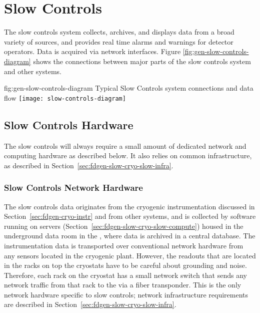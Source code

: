 \section{Slow Controls}
\label{sec:fdgen-slow-cryo-ctrl}


The slow controls system collects, archives, and displays data from
a broad variety of sources, and provides real time alarms and
warnings for detector operators. Data is acquired via network
interfaces.  Figure \ref{fig:gen-slow-controls-diagram} shows the
connections between major parts of the slow controls system and other
systems.  %

\begin{dunefigure}{fig:gen-slow-controls-diagram}
{Typical Slow Controls system connections and data flow}
\texttt{[image: slow-controls-diagram]}
\end{dunefigure}





\subsection{Slow Controls Hardware}
\label{sec:fdgen-slow-cryo-hdwr}

The slow controls will always require a small amount of dedicated network and
computing hardware as described below.  It also relies on common
infrastructure, as described in
Section~\ref{sec:fdgen-slow-cryo-slow-infra}.

\subsubsection{Slow Controls Network Hardware}
\label{sec:fdgen-slow-cryo-slow-network}
The slow controls data originates from the cryogenic instrumentation discussed in
Section~\ref{sec:fdgen-cryo-instr} and from other systems,
and is collected by software running on servers
(Section~\ref{sec:fdgen-slow-cryo-slow-compute})
housed in the underground data room in the ,
where data is archived in a central  database.
The instrumentation data is transported over
conventional network hardware from any sensors located in the cryogenic
plant.  However, the readouts that are located in the racks on top the
cryostats have to be careful about grounding and noise.  Therefore, each
rack on the cryostat has a small network switch that sends
any network traffic from that rack to the  via a fiber transponder.
This is the only network hardware specific to slow controls;
network infrastructure requirements are described in
Section~\ref{sec:fdgen-slow-cryo-slow-infra}.

